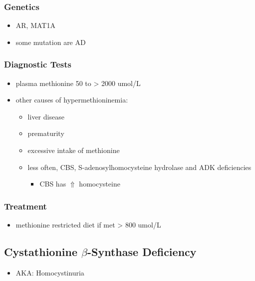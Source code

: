 \documentclass{scrartcl}
\begin{document}
\subsubsection{Genetics}
\label{sec:orgaa61ad0}
\begin{itemize}
\item AR, MAT1A
\item some mutation are AD
\end{itemize}
\subsubsection{Diagnostic Tests}
\label{sec:org0933c1a}
\begin{itemize}
\item plasma methionine 50 to \textgreater{} 2000 umol/L
\item other causes of hypermethioninemia:
\begin{itemize}
\item liver disease
\item prematurity
\item excessive intake of methionine
\item less often, CBS, S-adenosylhomocysteine hydrolase and ADK deficiencies
\begin{itemize}
\item CBS has \(\Uparrow\) homocysteine
\end{itemize}
\end{itemize}
\end{itemize}
\subsubsection{Treatment}
\label{sec:org0630584}
\begin{itemize}
\item methionine restricted diet if met \textgreater{} 800 umol/L
\end{itemize}

\subsection{Cystathionine \(\beta\)-Synthase Deficiency}
\label{sec:org0b82918}
\begin{itemize}
\item AKA: Homocystinuria
\end{itemize}
\end{document}
